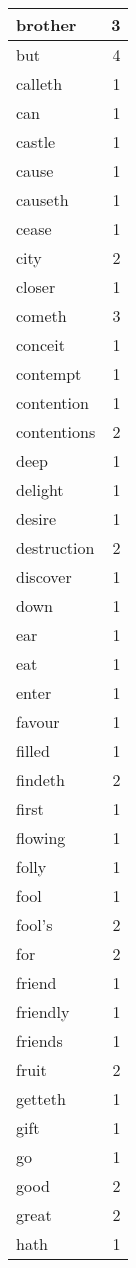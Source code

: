 \begin{center}
\begin{longtable}{l|r}
brother & 3\\ \hline 
but & 4\\ \hline 
calleth & 1\\ \hline 
can & 1\\ \hline 
castle & 1\\ \hline 
cause & 1\\ \hline 
causeth & 1\\ \hline 
cease & 1\\ \hline 
city & 2\\ \hline 
closer & 1\\ \hline 
cometh & 3\\ \hline 
conceit & 1\\ \hline 
contempt & 1\\ \hline 
contention & 1\\ \hline 
contentions & 2\\ \hline 
deep & 1\\ \hline 
delight & 1\\ \hline 
desire & 1\\ \hline 
destruction & 2\\ \hline 
discover & 1\\ \hline 
down & 1\\ \hline 
ear & 1\\ \hline 
eat & 1\\ \hline 
enter & 1\\ \hline 
favour & 1\\ \hline 
filled & 1\\ \hline 
findeth & 2\\ \hline 
first & 1\\ \hline 
flowing & 1\\ \hline 
folly & 1\\ \hline 
fool & 1\\ \hline 
fool's & 2\\ \hline 
for & 2\\ \hline 
friend & 1\\ \hline 
friendly & 1\\ \hline 
friends & 1\\ \hline 
fruit & 2\\ \hline 
getteth & 1\\ \hline 
gift & 1\\ \hline 
go & 1\\ \hline 
good & 2\\ \hline 
great & 2\\ \hline 
hath & 1\\ \hline 

\end{longtable}
\end{center}
